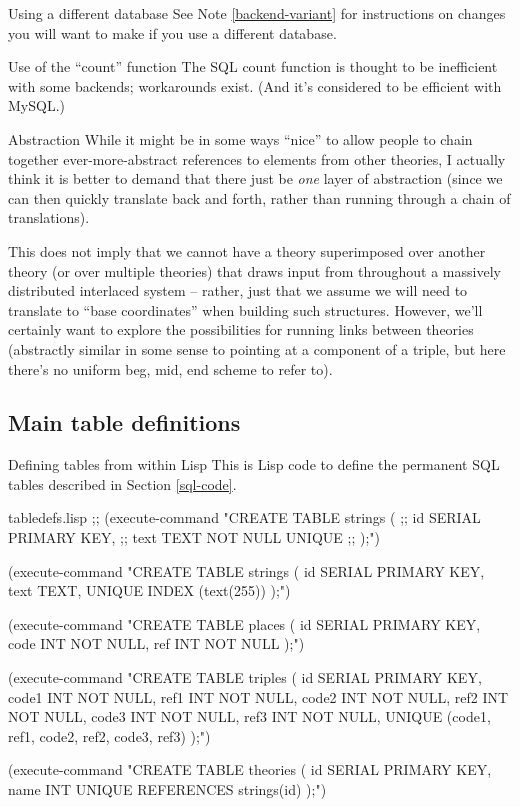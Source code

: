 \begin{notate}{Using a different database}
See Note \ref{backend-variant} for instructions on changes
you will want to make if you use a different database.
\end{notate}

\begin{notate}{Use of the ``count'' function}
The SQL count function is thought to be inefficient with
some backends; workarounds exist.  (And it's considered to
be efficient with MySQL.)
\end{notate}

\begin{notate}{Abstraction} \label{abstraction}
While it might be in some ways ``nice'' to allow people to
chain together ever-more-abstract references to elements
from other theories, I actually think it is better to
demand that there just be \emph{one} layer of abstraction
(since we can then quickly translate back and forth,
rather than running through a chain of translations).

This does not imply that we cannot have a theory
superimposed over another theory (or over multiple
theories) that draws input from throughout a massively
distributed interlaced system -- rather, just that we
assume we will need to translate to ``base coordinates''
when building such structures.  However, we'll certainly
want to explore the possibilities for running links
between theories (abstractly similar in some sense to
pointing at a component of a triple, but here there's no
uniform beg, mid, end scheme to refer to).
\end{notate}

\subsection{Main table definitions}

\begin{notate}{Defining tables from within Lisp}
This is Lisp code to define the permanent SQL tables
described in Section \ref{sql-code}.
\end{notate}

\begin{common}{tabledefs.lisp}
;; (execute-command "CREATE TABLE strings (
;;    id SERIAL PRIMARY KEY,
;;    text TEXT NOT NULL UNIQUE
;; );")

(execute-command "CREATE TABLE strings (
   id SERIAL PRIMARY KEY,
   text TEXT,
   UNIQUE INDEX (text(255))
);")

(execute-command "CREATE TABLE places (
   id SERIAL PRIMARY KEY,
   code INT NOT NULL,
   ref INT NOT NULL
);")

(execute-command "CREATE TABLE triples (
   id SERIAL PRIMARY KEY,
   code1 INT NOT NULL,
   ref1 INT NOT NULL,
   code2 INT NOT NULL,
   ref2 INT NOT NULL,
   code3 INT NOT NULL,
   ref3 INT NOT NULL,
   UNIQUE (code1, ref1,
           code2, ref2,
           code3, ref3)
);")

(execute-command "CREATE TABLE theories (
  id SERIAL PRIMARY KEY,
  name INT UNIQUE REFERENCES strings(id)
);")
\end{common}

